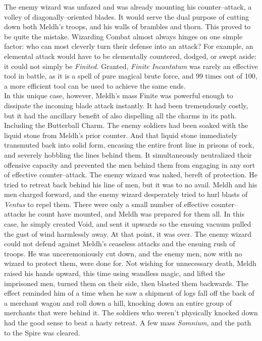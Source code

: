 The enemy wizard was unfazed and was already mounting his counter\mbox{--}attack, a volley of diagonally\mbox{--}oriented blades. It would serve the dual purpose of cutting down both Meldh’s troops, and his walls of brambles and thorn.
\SmallVSpace
This proved to be quite the mistake.
\SomeVSpace
Wizarding Combat almost always hinges on one simple factor: who can most cleverly turn their defense into an attack? For example, an elemental attack would have to be elementally countered, dodged, or swept aside: it could not simply be \emph{Finited.} Granted, \emph{Finite Incantatum} was rarely an effective tool in battle, as it is a spell of pure magical brute force, and 99 times out of 100, a more efficient tool can be used to achieve the same ends.\\In this unique case, however, Meldh’s mass Finite was powerful enough to dissipate the incoming blade attack instantly. It had been tremendously costly, but it had the ancillary benefit of also dispelling all the charms in its path.
\SmallVSpace
Including the Butterball Charm.
\SmallVSpace
The enemy soldiers had been soaked with the liquid stone from Meldh’s prior counter. And that liquid stone immediately transmuted back into solid form, encasing the entire front line in prisons of rock, and severely hobbling the lines behind them. It simultaneously neutralized their offensive capacity and prevented the men behind them from engaging in any sort of effective counter\mbox{--}attack.
\SmallVSpace
The enemy wizard was naked, bereft of protection. He tried to retreat back behind his line of men, but it was to no avail. Meldh and his men charged forward, and the enemy wizard desperately tried to hurl blasts of \emph{Ventus} to repel them. There were only a small number of effective counter\mbox{--}attacks he count have mounted, and Meldh was prepared for them all. In this case, he simply created Void, and sent it upwards so the ensuing vacuum pulled the gust of wind harmlessly away. At that point, it was over. The enemy wizard could not defend against Meldh’s ceaseless attacks and the ensuing rush of troops. He was unceremoniously cut down, and the enemy men, now with no wizard to protect them, were done for.
\SmallVSpace
Not wishing for unnecessary death, Meldh raised his hands upward, this time using wandless magic, and lifted the imprisoned men, turned them on their side, then blasted them backwards. The effect reminded him of a time when he saw a shipment of logs fall off the back of a merchant wagon and roll down a hill, knocking down an entire group of merchants that were behind it. The soldiers who weren’t physically knocked down had the good sense to beat a hasty retreat. A few mass \emph{Somnium}, and the path to the Spire was cleared.

